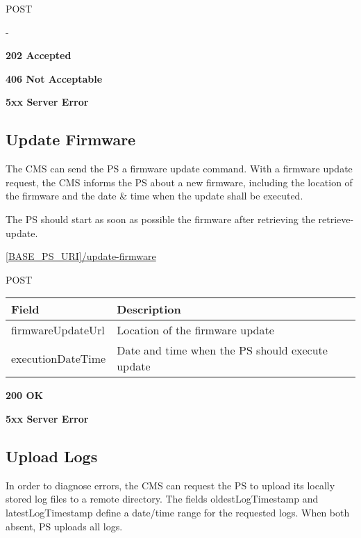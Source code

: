  POST

 -

 \textbf{202 Accepted}

 \textbf{406 Not Acceptable}

\textbf{5xx Server Error}

\subsection{Update Firmware}

The \acs{CMS} can send the \acs{PS} a firmware update command. With a firmware update request, the \acs{CMS} informs the \acs{PS} about a new firmware, including the location of the firmware and the date \& time when the update shall be executed.

The \acs{PS} should start as soon as possible the firmware after retrieving the retrieve-update.

 \url{[BASE_PS_URI]/update-firmware}

 POST

\begin{table}[!h]
\vspace{-7mm}
\begin{tabularx}{\linewidth}{ | l | X | }
  \hline
  \rowcolor{table-head}
  Field & Description \\
  \hline
  firmwareUpdateUrl 		& Location of the firmware update \\
  executionDateTime	&  Date and time when the \acs{PS} should execute update \\
  \hline
\end{tabularx}
\end{table}

 \textbf{200 OK}

 \textbf{5xx Server Error}

\subsection{Upload Logs}

In order to diagnose errors, the \acs{CMS} can request the \acs{PS} to upload its locally stored log files to a remote directory. The fields oldestLogTimestamp and latestLogTimestamp define a date/time range for the requested logs. When both absent, \acs{PS} uploads all logs.


